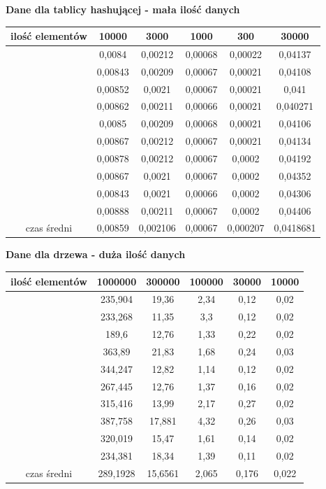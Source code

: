 \documentclass[12pt,a4paper,titlepage]{article}
\begin{document}
\begin{center}
\textbf{Dane dla tablicy hashującej - mała ilość danych}
\begin {tabular}{|c|c|c|c|c|c|}\hline
ilość elementów&10000&3000&1000&300&30000\\\hline
&0,0084&0,00212&0,00068&0,00022&0,04137\\\hline
&0,00843&0,00209&0,00067&0,00021&0,04108\\\hline
&0,00852&0,0021&0,00067&0,00021&0,041\\\hline
&0,00862&0,00211&0,00066&0,00021&0,040271\\\hline
&0,0085&0,00209&0,00068&0,00021&0,04106\\\hline
&0,00867&0,00212&0,00067&0,00021&0,04134\\\hline
&0,00878&0,00212&0,00067&0,0002&0,04192\\\hline
&0,00867&0,0021&0,00067&0,0002&0,04352\\\hline
&0,00843&0,0021&0,00066&0,0002&0,04306\\\hline
&0,00888&0,00211&0,00067&0,0002&0,04406\\\hline
czas średni&0,00859&0,002106&0,00067&0,000207&0,0418681\\\hline

\end{tabular}
\end {center}

\begin{center}
\textbf{Dane dla drzewa - duża ilość danych}
\begin {tabular}{|c|c|c|c|c|c|}\hline
ilość elementów&1000000&300000&100000&30000&10000\\\hline
&235,904&19,36&2,34&0,12&0,02\\\hline
&233,268&11,35&3,3&0,12&0,02\\\hline
&189,6&12,76&1,33&0,22&0,02\\\hline
&363,89&21,83&1,68&0,24&0,03\\\hline
&344,247&12,82&1,14&0,12&0,02\\\hline
&267,445&12,76&1,37&0,16&0,02\\\hline
&315,416&13,99&2,17&0,27&0,02\\\hline
&387,758&17,881&4,32&0,26&0,03\\\hline
&320,019&15,47&1,61&0,14&0,02\\\hline
&234,381&18,34&1,39&0,11&0,02\\\hline
czas średni&289,1928&15,6561&2,065&0,176&0,022\\\hline

\end{tabular}
\end {center}
\end{document}
